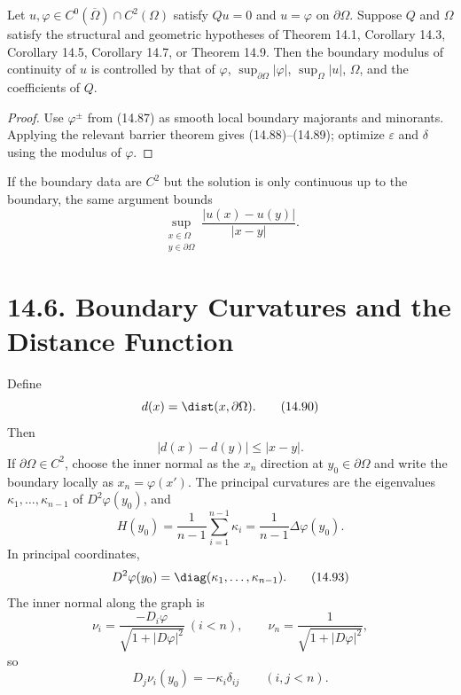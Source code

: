 \begin{theorem}
\label{gt14-boundary-gradient-14-15}
Let $u,\varphi\in C^0(\overline\Omega)\cap C^2(\Omega)$ satisfy $Qu=0$ and
$u=\varphi$ on $\partial\Omega$. Suppose $Q$ and $\Omega$ satisfy the structural
and geometric hypotheses of Theorem 14.1, Corollary 14.3, Corollary 14.5,
Corollary 14.7, or Theorem 14.9. Then the boundary modulus of continuity of
$u$ is controlled by that of $\varphi$, $\sup_{\partial\Omega}|\varphi|$,
$\sup_\Omega|u|$, $\Omega$, and the coefficients of $Q$.
\end{theorem}
\begin{proof}
\sketch Use $\varphi^\pm$ from (14.87) as smooth local boundary majorants and
minorants. Applying the relevant barrier theorem gives (14.88)--(14.89);
optimize $\varepsilon$ and $\delta$ using the modulus of $\varphi$.
\end{proof}

If the boundary data are $C^2$ but the solution is only continuous up to the
boundary, the same argument bounds
\[
\sup_{\substack{x\in\Omega\\y\in\partial\Omega}}
\frac{|u(x)-u(y)|}{|x-y|}.
\]

\section*{14.6. Boundary Curvatures and the Distance Function}

Define
\begin{equation}
d(x)=\dist(x,\partial\Omega).
\tag{14.90}
\end{equation}
Then
\begin{equation}
|d(x)-d(y)|\leq|x-y|.
\tag{14.91}
\end{equation}
If $\partial\Omega\in C^2$, choose the inner normal as the $x_n$ direction at
$y_0\in\partial\Omega$ and write the boundary locally as
$x_n=\varphi(x')$. The principal curvatures are the eigenvalues
$\kappa_1,\ldots,\kappa_{n-1}$ of $D^2\varphi(y_0)$, and
\begin{equation}
H(y_0)=\frac1{n-1}\sum_{i=1}^{n-1}\kappa_i
=\frac1{n-1}\Delta\varphi(y_0).
\tag{14.92}
\end{equation}
In principal coordinates,
\begin{equation}
D^2\varphi(y_0)=\diag(\kappa_1,\ldots,\kappa_{n-1}).
\tag{14.93}
\end{equation}
The inner normal along the graph is
\begin{equation}
\nu_i=\frac{-D_i\varphi}{\sqrt{1+|D\varphi|^2}}\ (i<n),
\qquad
\nu_n=\frac1{\sqrt{1+|D\varphi|^2}},
\tag{14.94}
\end{equation}
so
\begin{equation}
D_j\nu_i(y_0)=-\kappa_i\delta_{ij}
\qquad(i,j<n).
\tag{14.95}
\end{equation}

